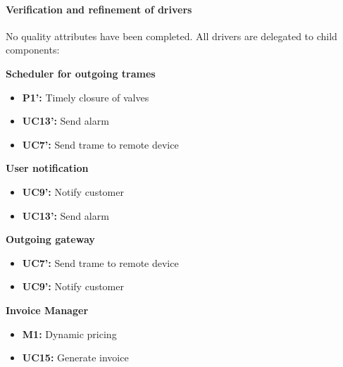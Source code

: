 \paragraph{Verification and refinement of drivers}
No quality attributes have been completed. All drivers are delegated to child components:

\textbf{Scheduler for outgoing trames}
\begin{itemize}
	\item \textbf{P1': } Timely closure of valves
	\item \textbf{UC13': } Send alarm
	\item \textbf{UC7': } Send trame to remote device
\end{itemize}

\textbf{User notification}
\begin{itemize}
	\item \textbf{UC9': } Notify customer
	\item \textbf{UC13': } Send alarm
\end{itemize}

\textbf{Outgoing gateway}
\begin{itemize}
	\item \textbf{UC7': } Send trame to remote device
	\item \textbf{UC9': } Notify customer
\end{itemize}

\textbf{Invoice Manager}
\begin{itemize}
	\item \textbf{M1: } Dynamic pricing
	\item \textbf{UC15: } Generate invoice
\end{itemize}
